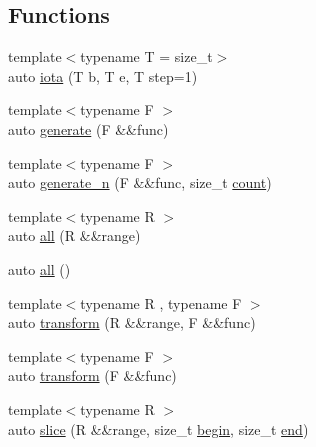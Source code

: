 \subsection*{Functions}
\begin{DoxyCompactItemize}
\item 
{\footnotesize template$<$typename T  = size\+\_\+t$>$ }\\auto \mbox{\hyperlink{namespace_r_a_h___n_a_m_e_s_p_a_c_e_1_1view_a35f45fd1457f206af50004cb2c929bff}{iota}} (T b, T e, T step=1)
\item 
{\footnotesize template$<$typename F $>$ }\\auto \mbox{\hyperlink{namespace_r_a_h___n_a_m_e_s_p_a_c_e_1_1view_a8f775415ab56d1024c456a3941504a4e}{generate}} (F \&\&func)
\item 
{\footnotesize template$<$typename F $>$ }\\auto \mbox{\hyperlink{namespace_r_a_h___n_a_m_e_s_p_a_c_e_1_1view_a9f7fb766d26e6d8016b650e166a5dbd5}{generate\+\_\+n}} (F \&\&func, size\+\_\+t \mbox{\hyperlink{namespace_r_a_h___n_a_m_e_s_p_a_c_e_a7c7b2627a4cd1c0877ea39d0b1bae608}{count}})
\item 
{\footnotesize template$<$typename R $>$ }\\auto \mbox{\hyperlink{namespace_r_a_h___n_a_m_e_s_p_a_c_e_1_1view_a97c539065057a274bc3209460378504c}{all}} (R \&\&range)
\item 
auto \mbox{\hyperlink{namespace_r_a_h___n_a_m_e_s_p_a_c_e_1_1view_afcf2f13d2403381f7fc39fdaf0899033}{all}} ()
\item 
{\footnotesize template$<$typename R , typename F $>$ }\\auto \mbox{\hyperlink{namespace_r_a_h___n_a_m_e_s_p_a_c_e_1_1view_afc88512dbbf36e723e366e7e9777b4ba}{transform}} (R \&\&range, F \&\&func)
\item 
{\footnotesize template$<$typename F $>$ }\\auto \mbox{\hyperlink{namespace_r_a_h___n_a_m_e_s_p_a_c_e_1_1view_abd91e5c36a5a72bcfad61004c569b733}{transform}} (F \&\&func)
\item 
{\footnotesize template$<$typename R $>$ }\\auto \mbox{\hyperlink{namespace_r_a_h___n_a_m_e_s_p_a_c_e_1_1view_a75574da8231039293d2a8e1f38484d25}{slice}} (R \&\&range, size\+\_\+t \mbox{\hyperlink{namespace_r_a_h___n_a_m_e_s_p_a_c_e_a40db588db40ca52dae948613525ac1b4}{begin}}, size\+\_\+t \mbox{\hyperlink{namespace_r_a_h___n_a_m_e_s_p_a_c_e_ad5f90a809a5221569377c400175a20bf}{end}})
\item 

\end{DoxyCompactItemize}
